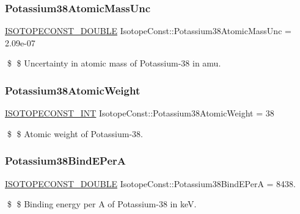 \subsubsection{\texorpdfstring{Potassium38\+Atomic\+Mass\+Unc}{Potassium38AtomicMassUnc}}
{\footnotesize\ttfamily \mbox{\hyperlink{group___isotope_const-_macros_ga8f45a7272ce02c0b4c65c44636ed719a}{I\+S\+O\+T\+O\+P\+E\+C\+O\+N\+S\+T\+\_\+\+D\+O\+U\+B\+LE}} Isotope\+Const\+::\+Potassium38\+Atomic\+Mass\+Unc = 2.\+09e-\/07}

\$ \$ Uncertainty in atomic mass of Potassium-\/38 in amu. \mbox{\label{group___isotope_const-_potassium-_k38_ga14a408117435036223d328c3d5228bdb}} 
\subsubsection{\texorpdfstring{Potassium38\+Atomic\+Weight}{Potassium38AtomicWeight}}
{\footnotesize\ttfamily \mbox{\hyperlink{group___isotope_const-_macros_ga5f18360b3e99483a35c32d789e62621c}{I\+S\+O\+T\+O\+P\+E\+C\+O\+N\+S\+T\+\_\+\+I\+NT}} Isotope\+Const\+::\+Potassium38\+Atomic\+Weight = 38}

\$ \$ Atomic weight of Potassium-\/38. \mbox{\label{group___isotope_const-_potassium-_k38_ga214595b3366cc8fe6fb7b8435e29e448}} 
\subsubsection{\texorpdfstring{Potassium38\+Bind\+E\+PerA}{Potassium38BindEPerA}}
{\footnotesize\ttfamily \mbox{\hyperlink{group___isotope_const-_macros_ga8f45a7272ce02c0b4c65c44636ed719a}{I\+S\+O\+T\+O\+P\+E\+C\+O\+N\+S\+T\+\_\+\+D\+O\+U\+B\+LE}} Isotope\+Const\+::\+Potassium38\+Bind\+E\+PerA = 8438.}

\$ \$ Binding energy per A of Potassium-\/38 in keV. \mbox{\label{group___isotope_const-_potassium-_k38_ga23626c609545812f0fbb0ec4caf61fb1}} 
